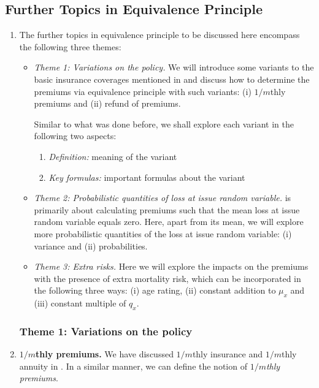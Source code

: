 \subsection{Further Topics in Equivalence Principle}
\begin{enumerate}
\item The further topics in equivalence principle to be discussed here
encompass the following three themes:
\begin{itemize}
\item \emph{Theme 1: Variations on the policy.} We will introduce some variants
to the basic insurance coverages mentioned in  and
discuss how to determine the premiums via equivalence principle with such
variants: (i) \(1/m\)thly premiums and (ii) refund of premiums.

Similar to what was done before, we shall explore each variant in the following
two aspects:
\begin{enumerate}[label={(\arabic*)}]
\item \emph{Definition:} meaning of the variant
\item \emph{Key formulas:} important formulas about the variant
\end{enumerate}
\item \emph{Theme 2: Probabilistic quantities of loss at issue random
variable.}  is primarily about calculating premiums
such that the mean loss at issue random variable equals zero. Here, apart from
its mean, we will explore more probabilistic quantities of the loss at issue
random variable: (i) variance and (ii) probabilities.
\item \emph{Theme 3: Extra risks.} Here we will explore the impacts on the
premiums with the presence of extra mortality risk, which can be incorporated
in the following three ways: (i) age rating, (ii) constant addition to
\(\mu_x\) and (iii) constant multiple of \(q_x\).
\end{itemize}
\subsubsection*{Theme 1: Variations on the policy}
\item \textbf{\(1/m\)thly premiums.} We have discussed \(1/m\)thly insurance
and \(1/m\)thly annuity in
. In a similar
manner, we can define the notion of \emph{\(1/m\)thly premiums}.


\end{enumerate}
